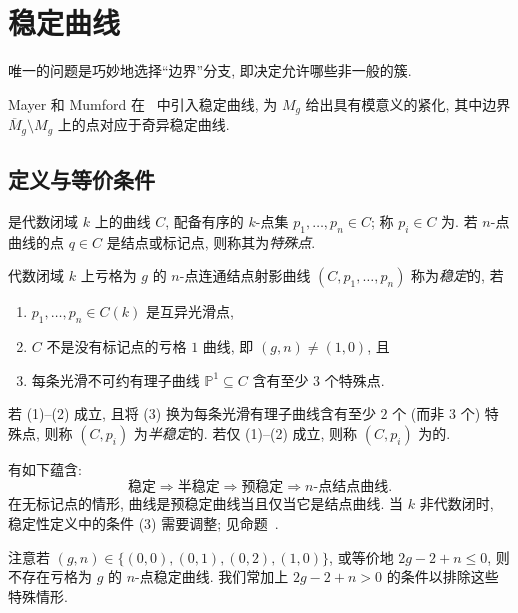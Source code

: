 \section{稳定曲线}\label{src:6.3}
\begin{epigraph}
唯一的问题是巧妙地选择``边界''分支, 即决定允许哪些非一般的簇.
\end{epigraph}
Mayer 和 Mumford 在~\cite{MM64a,MM64b} 中引入稳定曲线, 为 $M_g$ 给出具有模意义的紧化, 其中边界 $\overline M_g\setminus M_g$ 上的点对应于奇异稳定曲线.
\subsection{定义与等价条件}\label{src:6.3.1-subsection}
 是代数闭域 $k$ 上的曲线 $C$, 配备有序的 $k$-点集 $p_1,\allowbreak \ldots,\allowbreak p_n\in C$; 称 $p_i\in C$ 为. 若 $n$-点曲线的点 $q\in C$ 是结点或标记点, 则称其为\textit{特殊点}.
\begin{center}\end{center}
\setcounter{theorem}{1}
\begin{definition}[稳定, 半稳定与预稳定曲线]\label{src:6.3.2}
代数闭域 $k$ 上亏格为 $g$ 的 $n$-点连通结点射影曲线 $(C,\allowbreak p_1,\allowbreak \ldots,\allowbreak p_n)$ 称为\textit{稳定}的, 若
\begin{enumerate}[(1)]
\item $p_1,\allowbreak \ldots,\allowbreak p_n\in C(k)$ 是互异光滑点,
\item $C$ 不是没有标记点的亏格 $1$ 曲线, 即 $(g,\allowbreak n)\neq(1,\allowbreak 0)$, 且
\item 每条光滑不可约有理子曲线 $\mathbb P^1\subseteq C$ 含有至少 $3$ 个特殊点.
\end{enumerate}
若 (1)--(2) 成立, 且将 (3) 换为每条光滑有理子曲线含有至少 $2$ 个 (而非 $3$ 个) 特殊点, 则称 $(C,\allowbreak p_i)$ 为\textit{半稳定}的. 若仅 (1)--(2) 成立, 则称 $(C,\allowbreak p_i)$ 为的.
\end{definition}
有如下蕴含:
\[
\boxed{\text{稳定}\Rightarrow\text{半稳定}\Rightarrow\text{预稳定}\Rightarrow n\text{-点结点曲线}.}
\]
在无标记点的情形, 曲线是预稳定曲线当且仅当它是结点曲线. 当 $k$ 非代数闭时, 稳定性定义中的条件 (3) 需要调整; 见命题~.
\begin{remark}\label{src:6.3.3}
注意若 $(g,\allowbreak n)\in\{(0,\allowbreak 0),\allowbreak (0,\allowbreak 1),\allowbreak (0,\allowbreak 2),\allowbreak (1,\allowbreak 0)\}$, 或等价地 $2g-2+n\leq0$, 则不存在亏格为 $g$ 的 $n$-点稳定曲线. 我们常加上 $2g-2+n>0$ 的条件以排除这些特殊情形.
\end{remark}
